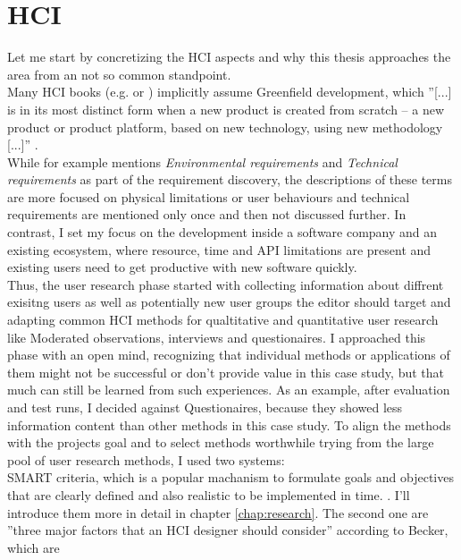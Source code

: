 \section{HCI}
Let me start by concretizing the HCI aspects and why this thesis approaches the area from an not so common standpoint.
\\
Many HCI books (e.g. \cite{Interactiondesign:2019ys} or \cite{LearnHCI:2020ys}) implicitly assume \label{def:Greenfield} Greenfield development,
which ''[...] is in its most distinct form when a new product is created from scratch – a new product or product platform, based on new technology, using new methodology [...]'' \cite{BrownfieldToGreenfield:2021ys}.
\\
While \cite[p. 392]{Interactiondesign:2019ys} for example mentions \textit{Environmental requirements} and \textit{Technical requirements} as part of the requirement discovery, the descriptions of these terms are more focused on physical limitations or user behaviours and technical requirements are mentioned only once and then not discussed further.
In contrast, I set my focus on the development inside a software company and an existing ecosystem, where resource, time and API limitations are present and existing users need to get productive with new software quickly.
\\
Thus, the user research phase started with collecting information about diffrent exisitng users as well as potentially new user groups the editor should target and adapting common HCI methods for qualtitative and quantitative user research like Moderated observations, interviews and questionaires.
I approached this phase with an open mind, recognizing that individual methods or applications of them might not be successful or don't provide value in this case study, but that much can still be learned from such experiences. As an example, after evaluation and test runs, I decided against Questionaires, because they showed less information content than other methods in this case study.
To align the methods with the projects goal and to select methods worthwhile trying from the large pool of user research methods, I used two systems:
\\
SMART criteria, which is a popular machanism to formulate goals and objectives that are clearly defined and also realistic to be implemented in time. \cite*{Atlassian:2021}.
I'll introduce them more in detail in chapter \ref*{chap:research}.
The second one are ''three major factors that an HCI designer should consider'' \cite[pp. 37-41]{LearnHCI:2020ys} according to Becker, which are
